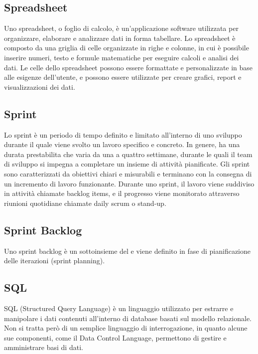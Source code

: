 \vspace{2em}
\subsection*{Spreadsheet}
\par Uno spreadsheet, o foglio di calcolo, è un'applicazione software utilizzata per organizzare, elaborare e analizzare dati in forma tabellare. Lo spreadsheet è composto da una griglia di celle organizzate in righe e colonne, in cui è possibile inserire numeri, testo e formule matematiche per eseguire calcoli e analisi dei dati. Le celle dello spreadsheet possono essere formattate e personalizzate in base alle esigenze dell'utente, e possono essere utilizzate per creare grafici, report e visualizzazioni dei dati.

\vspace{2em}
\subsection*{Sprint}
\par Lo sprint è un periodo di tempo definito e limitato all'interno di uno sviluppo  durante il quale viene svolto un lavoro specifico e concreto. In genere, ha una durata prestabilita che varia da una a quattro settimane, durante le quali il team di sviluppo si impegna a completare un insieme di attività pianificate. Gli sprint sono caratterizzati da obiettivi chiari e misurabili e terminano con la consegna di un incremento di lavoro funzionante. Durante uno sprint, il lavoro viene suddiviso in attività chiamate backlog items, e il progresso viene monitorato attraverso riunioni quotidiane chiamate daily scrum o stand-up.

\vspace{2em}
\subsection*{Sprint Backlog}
\par Uno sprint backlog è un sottoinsieme del  e viene definito in fase di pianificazione delle iterazioni (sprint planning).

\vspace{2em}
\subsection*{SQL}
\par SQL (Structured Query Language) è un linguaggio utilizzato per estrarre e manipolare i dati contenuti all'interno di database basati sul modello relazionale. Non si tratta però di un semplice linguaggio di interrogazione, in quanto alcune sue componenti, come il Data Control Language, permettono di gestire e amministrare basi di dati.

